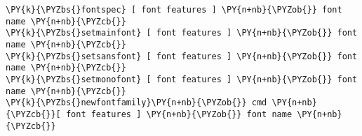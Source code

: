 \begin{Verbatim}[commandchars=\\\{\}]
\PY{k}{\PYZbs{}fontspec} [ font features ] \PY{n+nb}{\PYZob{}} font name \PY{n+nb}{\PYZcb{}}
\PY{k}{\PYZbs{}setmainfont} [ font features ] \PY{n+nb}{\PYZob{}} font name \PY{n+nb}{\PYZcb{}}
\PY{k}{\PYZbs{}setsansfont} [ font features ] \PY{n+nb}{\PYZob{}} font name \PY{n+nb}{\PYZcb{}}
\PY{k}{\PYZbs{}setmonofont} [ font features ] \PY{n+nb}{\PYZob{}} font name \PY{n+nb}{\PYZcb{}}
\PY{k}{\PYZbs{}newfontfamily}\PY{n+nb}{\PYZob{}} cmd \PY{n+nb}{\PYZcb{}}[ font features ] \PY{n+nb}{\PYZob{}} font name \PY{n+nb}{\PYZcb{}}
\end{Verbatim}
